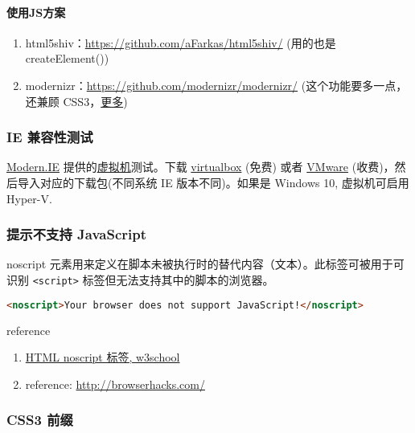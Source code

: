 \paragraph{使用JS方案}\label{ux4f7fux7528jsux65b9ux6848}

\begin{enumerate}
\def\labelenumi{\arabic{enumi}.}
\tightlist
\item
  html5shiv：\url{https://github.com/aFarkas/html5shiv/} (用的也是
  createElement())
\item
  modernizr：\url{https://github.com/modernizr/modernizr/}
  (这个功能要多一点，还兼顾
  CSS3，\href{http://www.osmn00.com/translation/221.html}{更多})
\end{enumerate}

\subsubsection{IE 兼容性测试}\label{ie-ux517cux5bb9ux6027ux6d4bux8bd5}

\href{https://dev.modern.ie/}{Modern.IE}
提供的\href{https://dev.modern.ie/tools/vms/windows/}{虚拟机}测试。下载
\href{https://www.virtualbox.org/}{virtualbox} (免费) 或者
\href{http://www.vmware.com/}{VMware}
(收费)，然后导入对应的下载包(不同系统 IE 版本不同)。如果是 Windows 10,
虚拟机可启用 Hyper-V.

\subsubsection{提示不支持
JavaScript}\label{ux63d0ux793aux4e0dux652fux6301-javascript}

noscript
元素用来定义在脚本未被执行时的替代内容（文本）。此标签可被用于可识别
\lstinline!<script>! 标签但无法支持其中的脚本的浏览器。

\begin{lstlisting}[language=HTML]
<noscript>Your browser does not support JavaScript!</noscript>
\end{lstlisting}

reference

\begin{enumerate}
\def\labelenumi{\arabic{enumi}.}
\tightlist
\item
  \href{http://www.w3school.com.cn/tags/tag_noscript.asp}{HTML noscript
  标签, w3school}
\item
  reference: \url{http://browserhacks.com/}
\end{enumerate}

\subsubsection{CSS3 前缀}\label{css3-ux524dux7f00}


